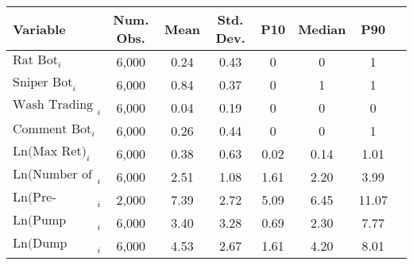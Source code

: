 \begin{tabular}{lccccccc}
\toprule
Variable & Num. Obs. & Mean & Std. Dev. & P10 & Median & P90\\
\midrule
$\text{Rat Bot}_{i}$ & 6,000 & 0.24 & 0.43 & 0 & 0 & 1\\
$\text{Sniper Bot}_{i}$ & 6,000 & 0.84 & 0.37 & 0 & 1 & 1\\
$\text{Wash Trading Bot}_{i}$ & 6,000 & 0.04 & 0.19 & 0 & 0 & 0\\
$\text{Comment Bot}_{i}$ & 6,000 & 0.26 & 0.44 & 0 & 0 & 1\\
$\text{Ln(Max Ret)}_{i}$ & 6,000 & 0.38 & 0.63 & 0.02 & 0.14 & 1.01\\
$\text{Ln(Number of Traders)}_{i}$ & 6,000 & 2.51 & 1.08 & 1.61 & 2.20 & 3.99\\
$\text{Ln(Pre-Migration Duration)}_{i}$ & 2,000 & 7.39 & 2.72 & 5.09 & 6.45 & 11.07\\
$\text{Ln(Pump Duration)}_{i}$ & 6,000 & 3.40 & 3.28 & 0.69 & 2.30 & 7.77\\
$\text{Ln(Dump Duration)}_{i}$ & 6,000 & 4.53 & 2.67 & 1.61 & 4.20 & 8.01\\
\bottomrule
\end{tabular}